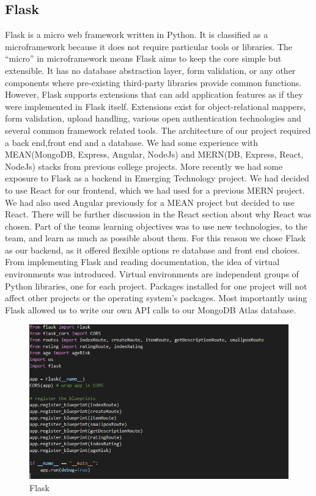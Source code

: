 \subsection{Flask}
Flask is a micro web framework written in Python. It is classified as a microframework because it does not require particular tools or libraries. The “micro” in microframework means Flask aims to keep the core simple but extensible. It has no database abstraction layer, form validation, or any other components where pre-existing third-party libraries provide common functions. However, Flask supports extensions that can add application features as if they were implemented in Flask itself. Extensions exist for object-relational mappers, form validation, upload handling, various open authentication technologies and several common framework related tools.\cite{flask}
The architecture of our project required a back end,front end and a database. We had some experience with MEAN(MongoDB, Express, Angular, NodeJs)  and MERN(DB, Express, React, NodeJs) stacks from previous college projects. More recently we had some exposure to Flask as a backend in Emerging Technology project. We had decided to use React for our frontend, which we had used for a previous MERN project. We had also used Angular previously for a MEAN project but decided to use React. There will be further discussion in the React section about why React was chosen. Part of the teams learning objectives was to use new technologies, to the team, and learn as much as possible about them. For this reason we chose Flask as our backend, as it offered flexible options re database and front end choices. From implementing Flask and reading documentation, the idea of virtual environments was introduced. Virtual environments are independent groups of Python libraries, one for each project. Packages installed for one project will not affect other projects or the operating system’s packages.\cite{virtualenv}
Most importantly using Flask allowed us to write our own API calls to our MongoDB Atlas database.

\begin{figure}[H]
    \centering
    \includegraphics[scale=0.45]{img/flask.PNG}
    \caption{Flask}
    \label{fig:my_label03}
\end{figure}



